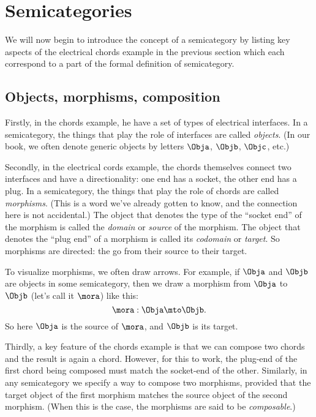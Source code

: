 
\section[Semicategories]{Semicategories}
\label{sec:formal-def-semicat}



We will now begin to introduce the concept of a semicategory by listing key aspects of the electrical chords example in the previous section which each correspond to a part of the formal definition of semicategory.

\subsection{Objects, morphisms, composition}

Firstly, in the chords example, he have a set of types of electrical interfaces.
In a semicategory, the things that play the role of interfaces are called \emph{objects}.
(In our book, we often denote generic objects by letters $\Obja$, $\Objb$, $\Objc$, etc.)

Secondly, in the electrical cords example, the chords themselves connect two interfaces and have a directionality: one end has a socket, the other end has a plug.
In a semicategory, the things that play the role of chords are called \emph{morphisms}.
(This is a word we've already gotten to know, and the connection here is not accidental.) The object that denotes the type of the ``socket end'' of the morphism is called the \emph{domain} or \emph{source} of the morphism.
The object that denotes the ``plug end'' of a morphism is called its \emph{codomain} or \emph{target}.
So morphisms are directed: the go from their source to their target.

To visualize morphisms, we often draw arrows.
For example, if $\Obja$ and $\Objb$ are objects in some semicategory, then we draw a morphism from $\Obja$ to $\Objb$ (let's call it $\mora$) like this:
\begin{equation}
    \mora: \Obja \mto \Objb.
\end{equation}
So here $\Obja$ is the source of $\mora$, and $\Objb$ is its target.

Thirdly, a key feature of the chords example is that we can compose two chords and the result is again a chord.
However, for this to work, the plug-end of the first chord being composed must match the socket-end of the other.
Similarly, in any semicategory we specify a way to compose two morphisms, provided that the target object of the first morphism matches the source object of the second morphism.
(When this is the case, the morphisms are said to be \emph{composable}.)

